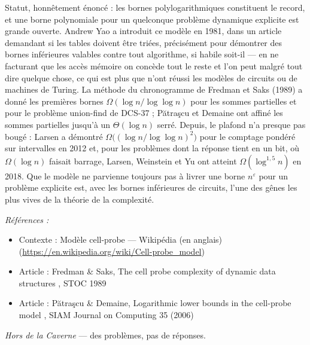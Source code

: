 \documentclass[11pt]{article}
\newenvironment{refs}{\par\small\noindent\emph{Références :}\begin{itemize}\setlength\itemsep{0pt}}{\end{itemize}\normalsize}
\begin{document}
\noindent Statut, honnêtement énoncé : les bornes polylogarithmiques constituent le record, et une borne polynomiale pour un quelconque problème dynamique explicite est grande ouverte. Andrew Yao a introduit ce modèle en 1981, dans un article demandant si les tables doivent être triées, précisément pour démontrer des bornes inférieures valables contre tout algorithme, si habile soit-il --- en ne facturant que les accès mémoire on concède tout le reste et l'on peut malgré tout dire quelque chose, ce qui est plus que n'ont réussi les modèles de circuits ou de machines de Turing. La méthode du chronogramme de Fredman et Saks (1989) a donné les premières bornes $ \Omega(\log n / \log\log n) $ pour les sommes partielles et pour le problème union-find de DCS-37 ; P\u{a}tra\c{s}cu et Demaine ont affiné les sommes partielles jusqu'à un $ \Theta(\log n) $ serré. Depuis, le plafond n'a presque pas bougé : Larsen a démontré $ \Omega\big((\log n/\log\log n)^2\big) $ pour le comptage pondéré sur intervalles en 2012 et, pour les problèmes dont la réponse tient en un bit, où $ \Omega(\log n) $ faisait barrage, Larsen, Weinstein et Yu ont atteint $ \Omega(\log^{1{,}5} n) $ en 2018. Que le modèle ne parvienne toujours pas à livrer une borne $ n^{\varepsilon} $ pour un problème explicite est, avec les bornes inférieures de circuits, l'une des gênes les plus vives de la théorie de la complexité.

\begin{refs}
\item Contexte : Modèle cell-probe --- Wikipédia (en anglais) (\url{https://en.wikipedia.org/wiki/Cell-probe_model})
\item Article : Fredman \& Saks, \og{} The cell probe complexity of dynamic data structures \fg{}, STOC 1989
\item Article : P\u{a}tra\c{s}cu \& Demaine, \og{} Logarithmic lower bounds in the cell-probe model \fg{}, SIAM Journal on Computing 35 (2006)
\end{refs}

\bigskip


\vfill
\noindent\emph{Hors de la Caverne} --- des probl\`emes, pas de r\'eponses.
\end{document}
